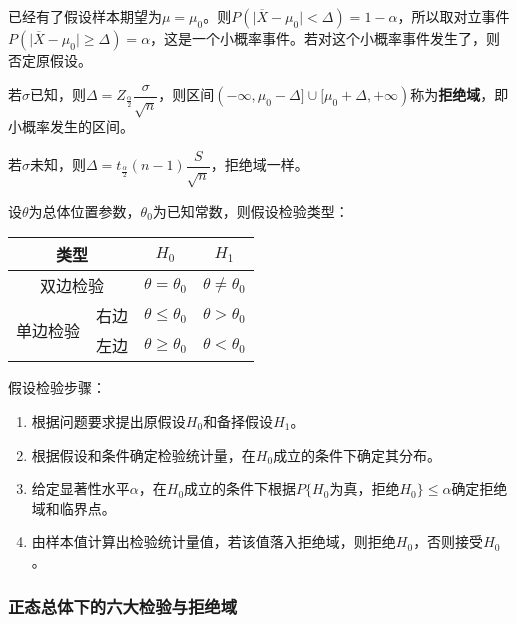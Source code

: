 已经有了假设样本期望为$\mu=\mu_0$。则$P(\vert\overline{X}-\mu_0\vert<\Delta)=1-\alpha$，所以取对立事件$P(\vert\overline{X}-\mu_0\vert\geqslant\Delta)=\alpha$，这是一个小概率事件。若对这个小概率事件发生了，则否定原假设。

若$\sigma$已知，则$\Delta=Z_\frac{\alpha}{2}\dfrac{\sigma}{\sqrt{n}}$，则区间$(-\infty,\mu_0-\Delta]\cup[\mu_0+\Delta,+\infty)$称为\textbf{拒绝域}，即小概率发生的区间。

若$\sigma$未知，则$\Delta=t_\frac{\alpha}{2}(n-1)\dfrac{S}{\sqrt{n}}$，拒绝域一样。

设$\theta$为总体位置参数，$\theta_0$为已知常数，则假设检验类型：\medskip

\begin{tabular}{|c|c|c|c|}
    \hline
    \multicolumn{2}{|c|}{类型} & $H_0$ & $H_1$ \\ \hline
    \multicolumn{2}{|c|}{双边检验} & $\theta=\theta_0$ & $\theta\neq\theta_0$ \\ \hline
    \multirow{2}{*}{单边检验} & 右边 & $\theta\leqslant\theta_0$ & $\theta>\theta_0$ \\ \cline{2-4}
    & 左边 & $\theta\geqslant\theta_0$ & $\theta<\theta_0$ \\ \hline
\end{tabular} \medskip

假设检验步骤：

\begin{enumerate}
    \item 根据问题要求提出原假设$H_0$和备择假设$H_1$。
    \item 根据假设和条件确定检验统计量，在$H_0$成立的条件下确定其分布。
    \item 给定显著性水平$\alpha$，在$H_0$成立的条件下根据$P\{H_0\text{为真，拒绝}H_0\}\leqslant\alpha$确定拒绝域和临界点。
    \item 由样本值计算出检验统计量值，若该值落入拒绝域，则拒绝$H_0$，否则接受$H_0$。
\end{enumerate}

\subsubsection{正态总体下的六大检验与拒绝域}

